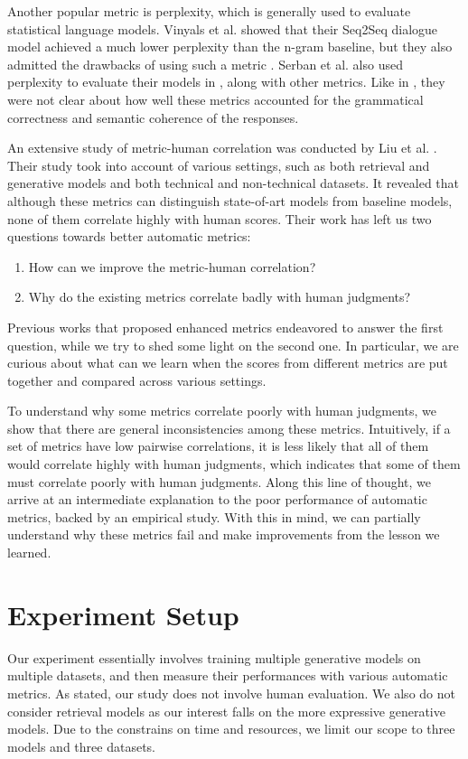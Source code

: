 \documentclass[runningheads]{llncs}
\begin{document}
    Another popular metric is perplexity, which is generally used to evaluate statistical language models. Vinyals et al. showed that their Seq2Seq dialogue model achieved a much lower perplexity than the n-gram baseline, but they also admitted the drawbacks of using such a metric \cite{GoogleChatbot}. Serban et al. also used perplexity to evaluate their models in \cite{HRED}, along with other metrics. Like in \cite{GoogleChatbot}, they were not clear about how well these metrics accounted for the grammatical correctness and semantic coherence of the responses.

    An extensive study of metric-human correlation was conducted by Liu et al. \cite{HowNot}. Their study took into account of various settings, such as both retrieval and generative models and both technical and non-technical datasets. It revealed that although these metrics can distinguish state-of-art models from baseline models, none of them correlate highly with human scores. Their work has left us two questions towards better automatic metrics:
    \begin{enumerate}
        \item How can we improve the metric-human correlation?
        \item Why do the existing metrics correlate badly with human judgments?
    \end{enumerate}
    Previous works that proposed enhanced metrics endeavored to answer the first question, while we try to shed some light on the second one. In particular, we are curious about what can we learn when the scores from different metrics are put together and compared across various settings.

    To understand why some metrics correlate poorly with human judgments, we show that there are general inconsistencies among these metrics. Intuitively, if a set of metrics have low pairwise correlations, it is less likely that all of them would correlate highly with human judgments, which indicates that some of them must correlate poorly with human judgments. Along this line of thought, we arrive at an intermediate explanation to the poor performance of automatic metrics, backed by an empirical study. With this in mind, we can partially understand why these metrics fail and make improvements from the lesson we learned.

    \section{Experiment Setup}
    Our experiment essentially involves training multiple generative models on multiple datasets, and then measure their performances with various automatic metrics. As stated, our study does not involve human evaluation. We also do not consider retrieval models as our interest falls on the more expressive generative models. Due to the constrains on time and resources, we limit our scope to three models and three datasets.
\end{document}
